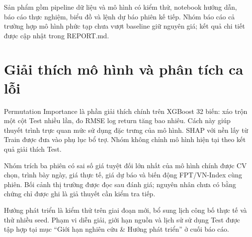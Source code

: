 \documentclass[12pt,a4paper]{article}
\begin{document}
Sản phẩm gồm pipeline dữ liệu và mô hình có kiểm thử, notebook hướng dẫn, báo cáo thực nghiệm, biểu đồ và lệnh dự báo phiên kế tiếp. Nhóm báo cáo cả trường hợp mô hình phức tạp chưa vượt baseline giữ nguyên giá; kết quả chi tiết được cập nhật trong REPORT.md.

\section{Giải thích mô hình và phân tích ca lỗi}
Permutation Importance là phần giải thích chính trên XGBoost 32 biến: xáo trộn một cột Test nhiều lần, đo RMSE log return tăng bao nhiêu. Cách này giúp thuyết trình trực quan mức sử dụng đặc trưng của mô hình. SHAP với nền lấy từ Train được đưa vào phụ lục bổ trợ. Nhóm không chỉnh mô hình hiện tại theo kết quả giải thích Test.

Nhóm trích ba phiên có sai số giá tuyệt đối lớn nhất của mô hình chính được CV chọn, trình bày ngày, giá thực tế, giá dự báo và biến động FPT/VN-Index cùng phiên. Bối cảnh thị trường được đọc sau đánh giá; nguyên nhân chưa có bằng chứng chỉ được ghi là giả thuyết cần kiểm tra tiếp.

Hướng phát triển là kiểm thử trên giai đoạn mới, bổ sung lịch công bố thực tế và thử nhiều seed. Phạm vi diễn giải, giới hạn nguồn và lịch sử sử dụng Test được tập hợp tại mục ``Giới hạn nghiên cứu \& Hướng phát triển'' ở cuối báo cáo.
\end{document}

